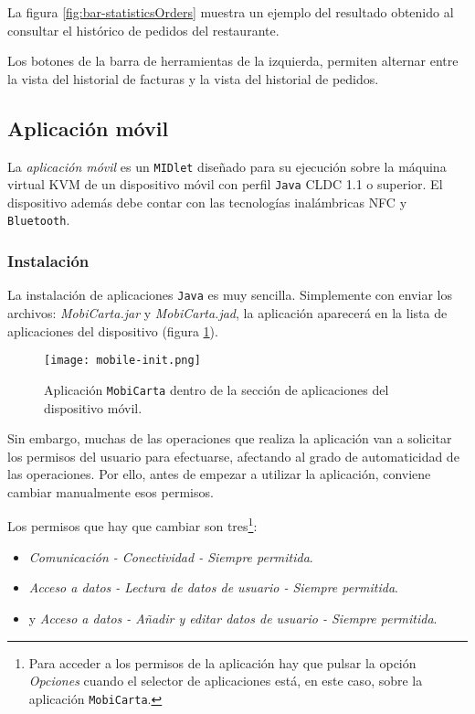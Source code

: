 La figura \ref{fig:bar-statisticsOrders} muestra un ejemplo del resultado
obtenido al consultar el histórico de pedidos del restaurante.

Los botones de la barra de herramientas de la izquierda, permiten alternar 
entre la vista del historial de facturas y la vista del historial de pedidos.

\subsection{Aplicación móvil}
La \emph{aplicación móvil} es un \texttt{MIDlet} diseñado para su ejecución 
sobre la máquina virtual \acs{KVM} de un dispositivo móvil con perfil
\texttt{Java} \acs{CLDC} 1.1 o superior. El dispositivo además debe contar
con las tecnologías inalámbricas \acs{NFC} y \texttt{Bluetooth}.

\subsubsection{Instalación}
La instalación de aplicaciones \texttt{Java} es muy sencilla. Simplemente con
enviar los archivos: \emph{MobiCarta.jar} y \emph{MobiCarta.jad}, la aplicación
aparecerá en la lista de aplicaciones del dispositivo (figura
\ref{fig:mobile-init}).

  \begin{figure}[H]
    \begin{center}
      \texttt{[image: mobile-init.png]}
      \caption{Aplicación \texttt{MobiCarta} dentro de la sección de 
      aplicaciones del dispositivo móvil.}
      \label{fig:mobile-init}
    \end{center}
  \end{figure}

Sin embargo, muchas de las operaciones que realiza la aplicación van a
solicitar los permisos del usuario para efectuarse, afectando al grado de
automaticidad de las operaciones. Por ello, antes de empezar a utilizar la 
aplicación, conviene cambiar manualmente esos permisos.

Los permisos que hay que cambiar son tres\footnote{Para acceder a los permisos 
de la aplicación hay que pulsar la opción \emph{Opciones} cuando el selector de 
aplicaciones está, en este caso, sobre la aplicación \texttt{MobiCarta}.}:
\begin{itemize}
\item \emph{Comunicación - Conectividad - Siempre permitida}.
\item \emph{Acceso a datos - Lectura de datos de usuario - Siempre permitida}.
\item y \emph{Acceso a datos - Añadir y editar datos de usuario - Siempre
permitida}.
\end{itemize}

